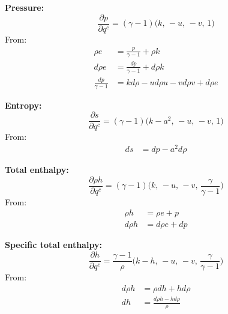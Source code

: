 \documentclass{article}
\begin{document}
\textbf{Pressure:}
\begin{equation*}
    \frac{\partial p}{\partial q^c} = (\gamma-1)\big(k,\, -u,\, -v,\, 1 \big)
\end{equation*}
From:
\begin{equation*}
    \begin{split}
         \rho e  & = \frac{p}{\gamma-1} + \rho k \\
         d\rho e & = \frac{dp}{\gamma-1} + d\rho k \\
         \frac{dp}{\gamma-1} & = kd\rho - ud\rho u - vd\rho v + d\rho e
    \end{split}
\end{equation*}

\textbf{Entropy:}
\begin{equation*}
    \frac{\partial s}{\partial q^c} = (\gamma-1)\big(k-a^2,\, -u,\, -v,\, 1 \big)
\end{equation*}
From:
\begin{equation*}
    \begin{split}
        ds & = dp - a^2 d\rho
    \end{split}
\end{equation*}

\textbf{Total enthalpy:}
\begin{equation*}
    \frac{\partial \rho h}{\partial q^c} = (\gamma-1)\big(k,\, -u,\, -v,\, \frac{\gamma}{\gamma-1} \big)
\end{equation*}
From:
\begin{equation*}
    \begin{split}
        \rho h  & = \rho e + p \\
        d\rho h & = d\rho e + dp
    \end{split}
\end{equation*}

\textbf{Specific total enthalpy:}
\begin{equation*}
    \frac{\partial h}{\partial q^c} = \frac{\gamma-1}{\rho}\big(k-h,\, -u,\, -v,\, \frac{\gamma}{\gamma-1} \big)
\end{equation*}
From:
\begin{equation*}
    \begin{split}
        d\rho h & = \rho dh + h d\rho \\
        dh      & = \frac{d\rho h - hd\rho}{\rho}
    \end{split}
\end{equation*}
\end{document}
